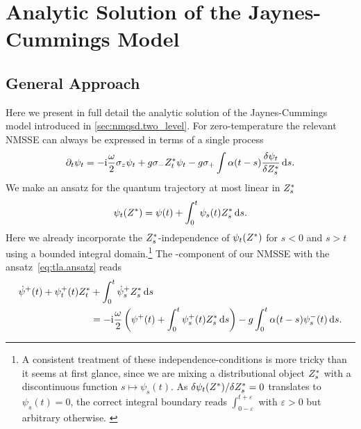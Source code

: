 \chapter{Analytic Solution of the Jaynes-Cummings Model}
\label{ch:tla}

\section{General Approach}
\label{sec:tla.general}

Here we present in full detail the analytic solution of the Jaynes-Cummings model introduced in \autoref{sec:nmqsd.two_level}.
For zero-temperature the relevant NMSSE can always be expressed in terms of a single process
\begin{equation}
  \partial_t \psi_t = -\mathrm{i}\frac{\omega}{2}\sigma_z\psi_t + g \sigma_- {Z}^*_t \psi_t - g\sigma_+ \int \alpha(t - s) \frac{\delta\psi_t}{\delta {Z}^*_s} \, \mathrm{d} s.
  \label{eq:tla.nmsse_twolevel}
\end{equation}
We make an ansatz for the quantum trajectory at most linear in ${Z}^*_s$
\begin{equation}
  \psitZ = \psi(t) + \int_0^t \psi_s(t) \ZZ_s \dd s.
  \label{eq:tla.ansatz}
\end{equation}
Here we already incorporate the ${Z}^*_s$-independence of $\psitZ$ for $s < 0$ and $s>t$ using a bounded integral domain.\footnote{%
  A consistent treatment of these independence-conditions is more tricky than it seems at first glance, since we are mixing a distributional object ${Z}^*_s$ with a discontinuous function $s \mapsto \psi_s(t)$.
  As $\delta \psi_t({Z}^*) / \delta {Z}^*_s = 0$ translates to $\psi_s(t) = 0$, the correct integral boundary reads $\int_{0-\varepsilon}^{t+\varepsilon}$ with $\varepsilon > 0$ but arbitrary otherwise.
  \label{fn:tla.boundaries}
}
The \quotes{+}-component of our NMSSE with the ansatz~\ref{eq:tla.ansatz} reads
\begin{align}
  \dot\psi^+(t) + \psi^+_t(t){Z}^*_t &+ \int_0^t \dot\psi^+_s{Z}^*_s \, \mathrm{d} s \nonumber\\
  &= -\mathrm{i} \frac{\omega}{2} \left( \psi^+(t) + \int_0^t \psi^+_s(t){Z}^*_s \, \mathrm{d} s \right) - g \int_0^t \alpha(t-s) \psi^-_s(t) \, \mathrm{d} s.
  \label{eq:tla.psi_plus}
\end{align}
